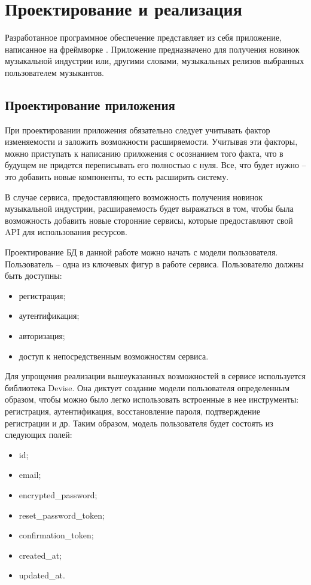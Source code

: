 \section{Проектирование и реализация} %
\label{sec:arch_and_realization}


Разработанное программное обеспечение представляет из себя приложение, написанное на фреймворке \ror{}.
Приложение предназначено для получения новинок музыкальной индустрии или, другими словами, музыкальных релизов выбранных пользователем музыкантов.

\subsection{Проектирование приложения}
\label{sub:arch_and_mod:design}
При проектировании приложения обязательно следует учитывать фактор изменяемости и заложить возможности расширяемости. Учитывая эти факторы, можно приступать к написанию приложения с осознанием того факта, что в будущем не придется переписывать его полностью с нуля. Все, что будет нужно -- это добавить новые компоненты, то есть расширить систему.

В случае сервиса, предоставляющего возможность получения новинок музыкальной индустрии, расшираяемость будет выражаться в том, чтобы была возможность добавить новые сторонние сервисы, которые предоставляют свой API для использования ресурсов.

Проектирование БД в данной работе можно начать с модели пользователя. Пользователь -- одна из ключевых фигур в работе сервиса. Пользователю должны быть доступны:

\begin{itemize}
  \item регистрация;
  \item аутентификация;
  \item авторизация;
  \item доступ к непосредственным возможностям сервиса.
\end{itemize}

Для упрощения реализации вышеуказанных возможностей в сервисе используется библиотека Devise. Она диктует создание модели пользователя определенным образом, чтобы можно было легко использовать встроенные в нее инструменты: регистрация, аутентификация, восстановление пароля, подтверждение регистрации и др. Таким образом, модель пользователя будет состоять из следующих полей:

\begin{itemize}
  \item id;
  \item email;
  \item encrypted\_password;
  \item reset\_password\_token;
  \item confirmation\_token;
  \item created\_at;
  \item updated\_at.
\end{itemize}


